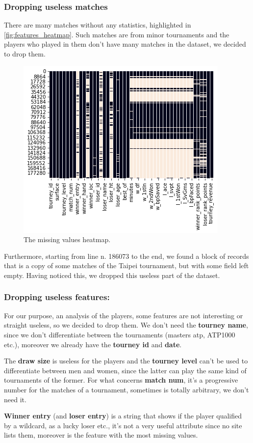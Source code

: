 \subsubsection{Dropping useless matches}
There are many matches without any statistics, highlighted in \autoref{fig:features_heatmap}. Such matches are from minor tournaments and the players who played in them don't have many  matches in the dataset, we decided to drop them.
\begin{figure}[H]
    \centering
    \includegraphics[width= 0.55\linewidth]{images/data_understanding/features_heatmap.png}
    \caption{The missing values heatmap.}
    \label{fig:features_heatmap}
\end{figure}
Furthermore, starting from line n. 186073 to the end, we found a block of records that is a copy of some matches of the Taipei tournament, but with some field left empty. Having noticed this, we dropped this useless part of the dataset.

\subsubsection{Dropping useless features:}
For our purpose, an analysis of the players, some features are not interesting or straight useless, so we decided to drop them. We don't need the \textbf{tourney name}, since we don't differentiate between the tournaments (masters atp, ATP1000 etc.), moreover we already have the \textbf{tourney id} and \textbf{date}.

The \textbf{draw size} is useless for the players and the \textbf{tourney level} can't be used to differentiate between men and women, since the latter can play the same kind of tournaments of the former. For what concerns \textbf{match num}, it's a progressive number for the matches of a tournament, sometimes is totally arbitrary, we don't need it.

\textbf{Winner entry} (and \textbf{loser entry}) is a string that shows if the player qualified by a wildcard, as a lucky loser etc., it's not a very useful attribute since no site lists them, moreover is the feature with the most missing values.

